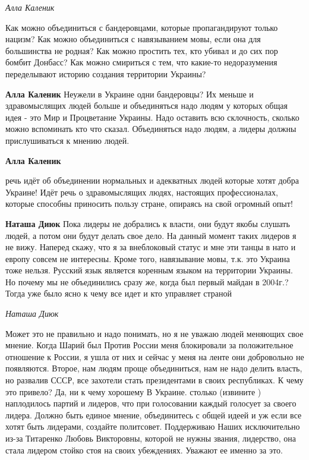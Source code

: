 \emph{Алла Каленик}

Как можно объединиться с бандеровцами, которые пропагандируют только нацизм?
Как можно объединиться с навязыванием мовы, если она для большинства не родная?
Как можно простить тех, кто убивал и до сих пор бомбит Донбасс? Как можно
смириться с тем, что какие-то недоразумения переделывают историю создания
территории Украины?

\begin{itemize}

\textbf{Алла Каленик} Неужели в Украине одни бандеровцы? Их меньше и
здравомыслящих людей больше и объединяться надо людям у которых общая идея - это
Мир и Процветание Украины. Надо оставить всю склочность, сколько можно
вспоминать кто что сказал. Объединяться надо людям, а лидеры должны
прислушиваться к мнению людей.

\textbf{Алла Каленик} 

речь идёт об объединении нормальных и адекватных людей которые хотят добра
Украине! Идёт речь о здравомыслящих людях, настоящих профессионалах, которые
способны приносить пользу стране, опираясь на свой огромный опыт!


\textbf{Наташа Диюк} Пока лидеры не добрались к власти, они будут якобы слушать
людей, а потом они будут делать свое дело. На данный момент таких лидеров я не
вижу. Наперед скажу, что я за внеблоковый статус и мне эти танцы в нато и
европу совсем не интересны. Кроме того, навязывание мовы, т.к. это Украина тоже
нельзя. Русский язык является коренным языком на территории Украины. Но почему
мы не объединились сразу же, когда был первый майдан в 2004г.? Тогда уже было
ясно к чему все идет и кто управляет страной

\end{itemize}

\emph{Наташа Диюк}

Может это не правильно и надо понимать, но я не уважаю людей меняющих свое
мнение. Когда Шарий был Против России меня блокировали за положительное
отношение к России, я ушла от них и сейчас у меня на ленте они добровольно не
появляются. Второе, нам людям проще объединиться, нам не надо делить власть,
но развалив СССР, все захотели стать президентами в своих республиках. К чему
это привело? Да, ни к чему хорошему В Украине. столько (извините ) наплодилось
партий и лидеров, что при голосовании каждый голосует за своего лидера. Должно
быть единое мнение, объединитесь с общей идеей и уж если все хотят быть
лидерами, создайте политсовет. Поддерживаю Наших исключительно из-за Титаренко
Любовь Викторовны, которой не нужны звания, лидерство, она стала лидером стойко
стоя на своих убеждениях. Уважают ее именно за это.

